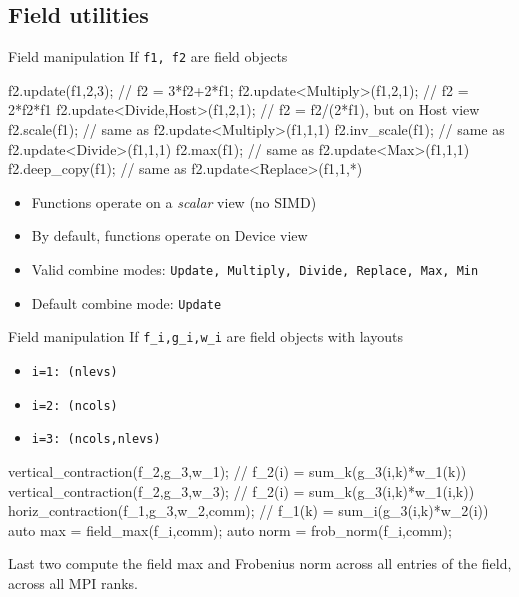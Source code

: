 \documentclass[8pt,NM,theme=angles,number=SAND2025-01977PE]{sandia-beamer}
\begin{document}
\subsection{Field utilities}
\begin{frame}[fragile]{Field manipulation}
  If \texttt{f1, f2} are field objects

  \vspace{-0.5cm}
  \begin{semiverbatim} \small
    f2.update(f1,2,3);              // f2 = 3*f2+2*f1;
    f2.update<Multiply>(f1,2,1);    // f2 = 2*f2*f1
    f2.update<Divide,Host>(f1,2,1); // f2 = f2/(2*f1), but on Host view
    f2.scale(f1);                   // same as f2.update<Multiply>(f1,1,1)
    f2.inv\_scale(f1);              // same as f2.update<Divide>(f1,1,1)
    f2.max(f1);                     // same as f2.update<Max>(f1,1,1)
    f2.deep\_copy(f1);              // same as f2.update<Replace>(f1,1,*)
  \end{semiverbatim}

  \vspace{-0.5cm}
  \begin{itemize}
    \item Functions operate on a \emph{scalar} view (no SIMD)
    \item By default, functions operate on Device view
    \item Valid combine modes: \texttt{Update, Multiply, Divide, Replace, Max, Min}
    \item Default combine mode: \texttt{Update}
  \end{itemize}
\end{frame}

\begin{frame}[fragile]{Field manipulation}
  If \texttt{f\_i,g\_i,w\_i} are field objects with layouts

  \begin{itemize}
    \item \texttt{i=1: (nlevs)} 
    \item \texttt{i=2: (ncols)} 
    \item \texttt{i=3: (ncols,nlevs)} 
  \end{itemize}

  \vspace{-0.5cm}
  \begin{semiverbatim} \small
    vertical\_contraction(f\_2,g\_3,w\_1); // f\_2(i) = sum\_k(g\_3(i,k)*w\_1(k))
    vertical\_contraction(f\_2,g\_3,w\_3); // f\_2(i) = sum\_k(g\_3(i,k)*w\_1(i,k))
    horiz\_contraction(f\_1,g\_3,w\_2,comm); // f\_1(k) = sum\_i(g\_3(i,k)*w\_2(i))
    auto max = field\_max(f\_i,comm);
    auto norm = frob\_norm(f\_i,comm);
  \end{semiverbatim}
  Last two compute the field max and Frobenius norm across all entries of the field, across all MPI ranks.

\end{frame}
\end{document}
